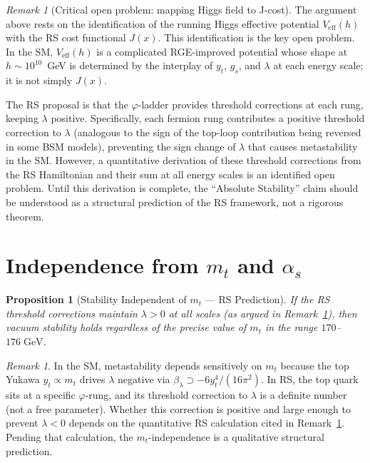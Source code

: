 \documentclass[12pt,a4paper]{article}
\newtheorem{proposition}[theorem]{Proposition}
\theoremstyle{definition}
\theoremstyle{remark}
\newtheorem{remark}[theorem]{Remark}
\begin{document}
\begin{remark}[Critical open problem: mapping Higgs field to J-cost]
\label{rem:openproblem}
The argument above rests on the identification of the running
Higgs effective potential $V_{\mathrm{eff}}(h)$ with the RS
cost functional $J(x)$.  This identification is the key open
problem.  In the SM, $V_{\mathrm{eff}}(h)$ is a complicated
RGE-improved potential whose shape at $h \sim 10^{10}$~GeV is
determined by the interplay of $y_t$, $g_s$, and $\lambda$ at
each energy scale; it is not simply $J(x)$.

The RS proposal is that the $\varphi$-ladder provides threshold
corrections at each rung, keeping $\lambda$ positive.  Specifically,
each fermion rung contributes a positive threshold correction to
$\lambda$ (analogous to the sign of the top-loop contribution being
reversed in some BSM models), preventing the sign change of
$\lambda$ that causes metastability in the SM.  However, a
quantitative derivation of these threshold corrections from the RS
Hamiltonian and their sum at all energy scales is an identified
open problem.  Until this derivation is complete, the ``Absolute
Stability'' claim should be understood as a structural prediction
of the RS framework, not a rigorous theorem.
\end{remark}

\section{Independence from $m_t$ and $\alpha_s$}
\label{sec:independence}

\begin{proposition}[Stability Independent of $m_t$ --- RS Prediction]
\label{prop:mt-independent}
If the RS threshold corrections maintain $\lambda > 0$ at all
scales (as argued in Remark~\ref{rem:openproblem}), then vacuum
stability holds regardless of the precise value of $m_t$ in the
range $170$--$176\;\mathrm{GeV}$.
\end{proposition}

\begin{remark}
In the SM, metastability depends sensitively on $m_t$ because the
top Yukawa $y_t \propto m_t$ drives $\lambda$ negative via
$\beta_\lambda \supset -6y_t^4/(16\pi^2)$.  In RS, the top quark
sits at a specific $\varphi$-rung, and its threshold correction to
$\lambda$ is a definite number (not a free parameter).  Whether this
correction is positive and large enough to prevent $\lambda < 0$
depends on the quantitative RS calculation cited in
Remark~\ref{rem:openproblem}.  Pending that calculation, the
$m_t$-independence is a qualitative structural prediction.
\end{remark}
\end{document}
